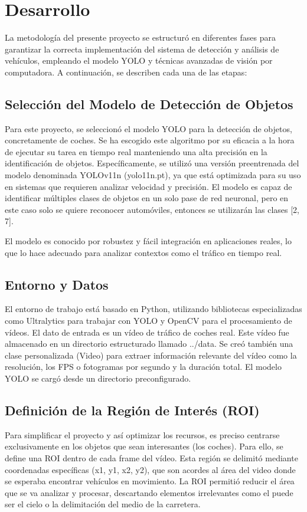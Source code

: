 \section {Desarrollo}
La metodología del presente proyecto se estructuró en diferentes fases para garantizar la correcta implementación del sistema de detección y análisis de vehículos, empleando el modelo YOLO y técnicas avanzadas de visión por computadora. A continuación, se describen cada una de las etapas:

\subsection{Selección del Modelo de Detección de Objetos}

Para este proyecto, se seleccionó el modelo YOLO para la detección de objetos, concretamente de coches. Se ha escogido este algoritmo por su eficacia a la hora de ejecutar su tarea en tiempo real manteniendo una alta precisión en la identificación de objetos.
Específicamente, se utilizó una versión preentrenada del modelo denominada YOLOv11n (yolo11n.pt), ya que está optimizada para su uso en sistemas que requieren analizar velocidad y precisión.  El modelo es capaz de identificar múltiples clases de objetos en un solo pase de red neuronal, pero en este caso solo se quiere reconocer automóviles, entonces se utilizarán las clases [2, 7].

El modelo es conocido por robustez y fácil integración en aplicaciones reales, lo que lo hace adecuado para analizar contextos como el tráfico en tiempo real.
\subsection{Entorno y Datos}

El entorno de trabajo está basado en Python, utilizando bibliotecas especializadas como Ultralytics para trabajar con YOLO y OpenCV para el procesamiento de vídeos.
El dato de entrada es un vídeo de tráfico de coches real.  Este vídeo fue almacenado en un directorio estructurado llamado ../data.  Se creó también una clase personalizada (Video) para extraer información relevante del vídeo como la resolución, los FPS o fotogramas por segundo y la duración total.
El modelo YOLO se cargó desde un directorio preconfigurado.

\subsection{Definición de la Región de Interés (ROI)}
Para simplificar el proyecto y así optimizar los recursos, es preciso centrarse exclusivamente en los objetos que sean interesantes (los coches).  Para ello, se define una ROI dentro de cada frame del vídeo.
Esta región se delimitó mediante coordenadas específicas (x1, y1, x2, y2), que son acordes al área del video donde se esperaba encontrar vehículos en movimiento. La ROI permitió reducir el área que se va analizar y procesar, descartando elementos irrelevantes como el puede ser el cielo o la delimitación del medio de la carretera.

